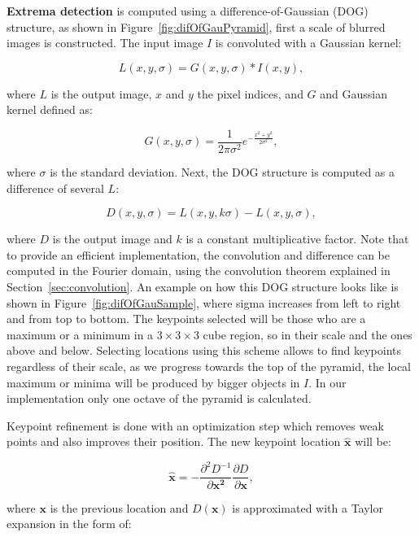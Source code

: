 \documentclass[12pt]{article}
\begin{document}
\textbf{Extrema detection} is computed using a difference-of-Gaussian (DOG) structure, as shown in Figure~\ref{fig:difOfGauPyramid}, first a scale of blurred images is constructed.
The input image $I$ is convoluted with a Gaussian kernel:

\begin{equation}
L(x,y,\sigma) = G(x,y,\sigma) * I(x,y),
\end{equation}

where $L$ is the output image, $x$ and $y$ the pixel indices, and $G$ and Gaussian kernel defined as:

\begin{equation}
G(x,y,\sigma) = \frac{1}{2 \pi \sigma^2} e^{- \frac{x^2 + y^2}{2 \sigma^2}},
\end{equation}

where $\sigma$ is the standard deviation.
Next, the DOG structure is computed as a difference of several $L$:

\begin{equation}
D(x,y,\sigma) = L(x,y, k\sigma) - L(x,y, \sigma),
\end{equation}

where $D$ is the output image and $k$ is a constant multiplicative factor.
Note that to provide an efficient implementation, the convolution and difference can be computed in the Fourier domain, using the convolution theorem explained in Section~\ref{sec:convolution}.
An example on how this DOG structure looks like is shown in Figure~\ref{fig:difOfGauSample}, where sigma increases from left to right and from top to bottom.
The keypoints selected will be those who are a maximum or a minimum in a $3 \times 3 \times 3$ cube region, so in their scale and the ones above and below.
Selecting locations using this scheme allows to find keypoints regardless of their scale, as we progress towards the top of the pyramid,  the local maximum or minima will be produced by bigger objects in $I$.
In our implementation only one octave of the pyramid is calculated.

Keypoint refinement is done with an optimization step which removes weak points and also improves their position.
The new keypoint location $\mathbf{\hat{x}}$ will be:

\begin{equation}
\mathbf{\hat{x}} = - \frac{\partial^2 D^{-1}}{\partial \mathbf{x^2}} \frac{\partial D}{\partial \mathbf{x}},
\end{equation}

where $\mathbf{x}$ is the previous location and $D(\mathbf{x})$ is approximated with a Taylor expansion in the form of:
\end{document}
